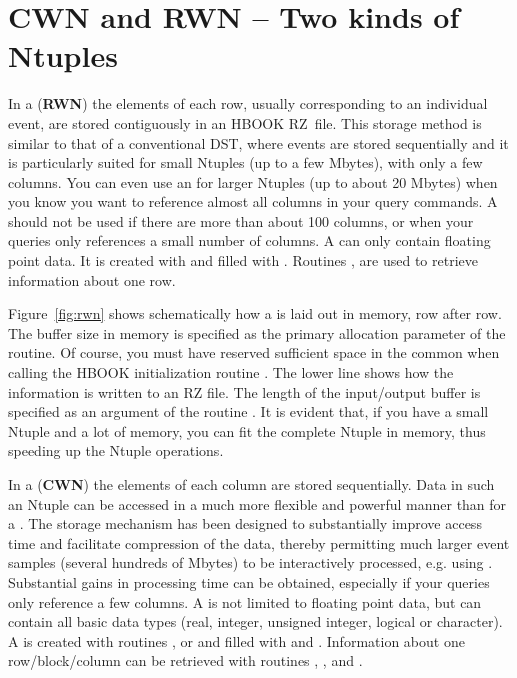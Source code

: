 \section{CWN and RWN -- Two kinds of Ntuples}

In a  ({\bf RWN}) the elements of each row, usually
corresponding to an individual event,
are stored contiguously in an HBOOK RZ~file.
This storage method is similar to that of a conventional
DST, where events are stored sequentially and
it is particularly suited for small Ntuples (up to
a few Mbytes), with only a few columns.
You can even use an \RWN{} for larger Ntuples (up to about 20 Mbytes) when
you know you want to reference almost all columns in your query commands.
A \RWN{} should not be used if there are more than about 100 columns, or
when your queries only references a small number of columns.
A \RWN{} can only contain floating point data.
It is created with  and filled with .
Routines
,  are used to retrieve information about one row.

Figure~\ref{fig:rwn} shows schematically how a \RWN{} is laid out in
memory, row after row. The buffer size in memory  is
specified as the primary allocation parameter  of the
 routine.
Of course, you must have reserved sufficient space in the
%
 common when calling the HBOOK initialization
routine .
The lower line shows how the information is written to an RZ file.
The length of the input/output buffer  is specified as an
argument of the routine .
%
It is evident that, if you have a small Ntuple and a lot of memory,
you can fit the complete Ntuple in memory, thus speeding up the
Ntuple operations.

In a  ({\bf CWN}) the elements of each column are
stored sequentially.
Data in such an Ntuple can be accessed in a much more flexible
and powerful manner than for a \RWN{}.
The \CWN{} storage mechanism has been designed to substantially improve access
 time
and facilitate compression of the data, thereby permitting much larger
event samples (several hundreds of Mbytes) to be interactively processed,
e.g. using \PAW.
Substantial gains in processing time can be obtained, especially if
your queries only reference a few columns.
A \CWN{} is not limited to floating point data, but can contain
all basic data types (real, integer, unsigned integer, logical or character).
A \CWN{} is created with routines ,  or 
 and filled
with  and .
Information about one row/block/column can be retrieved with routines
, ,  and .

